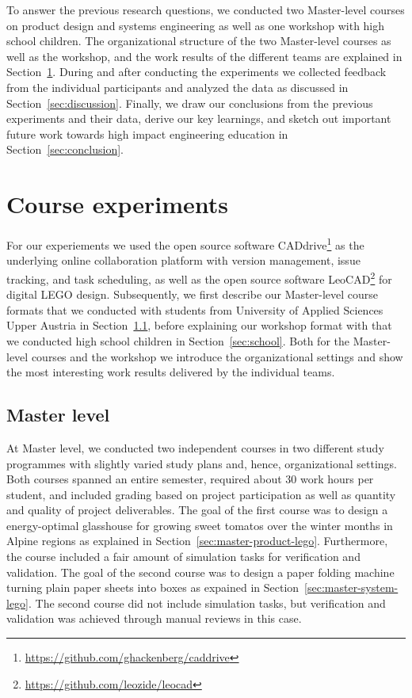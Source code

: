 \documentclass{PDS}
\begin{document}
To answer the previous research questions, we conducted two Master-level courses on product design and systems engineering as well as one workshop with high school children.
The organizational structure of the two Master-level courses as well as the workshop, and the work results of the different teams are explained in Section~\ref{sec:contribution}.
During and after conducting the experiments we collected feedback from the individual participants and analyzed the data as discussed in Section~\ref{sec:discussion}.
Finally, we draw our conclusions from the previous experiments and their data, derive our key learnings, and sketch out important future work towards high impact engineering education in Section~\ref{sec:conclusion}.

\section{Course experiments}
\label{sec:contribution}

For our experiements we used the open source software CADdrive\footnote{\url{https://github.com/ghackenberg/caddrive}} as the underlying online collaboration platform with version management, issue tracking, and task scheduling, as well as the open source software LeoCAD\footnote{\url{https://github.com/leozide/leocad}} for digital LEGO design.
Subsequently, we first describe our Master-level course formats that we conducted with students from University of Applied Sciences Upper Austria in Section~\ref{sec:master}, before explaining our workshop format with that we conducted high school children in Section~\ref{sec:school}.
Both for the Master-level courses and the workshop we introduce the organizational settings and show the most interesting work results delivered by the individual teams.

\subsection{Master level}
\label{sec:master}

At Master level, we conducted two independent courses in two different study programmes with slightly varied study plans and, hence, organizational settings.
Both courses spanned an entire semester, required about 30 work hours per student, and included grading based on project participation as well as quantity and quality of project deliverables.
The goal of the first course was to design a energy-optimal glasshouse for growing sweet tomatos over the winter months in Alpine regions as explained in Section~\ref{sec:master-product-lego}.
Furthermore, the course included a fair amount of simulation tasks for verification and validation.
The goal of the second course was to design a paper folding machine turning plain paper sheets into boxes as expained in Section~\ref{sec:master-system-lego}.
The second course did not include simulation tasks, but verification and validation was achieved through manual reviews in this case.
\end{document}
